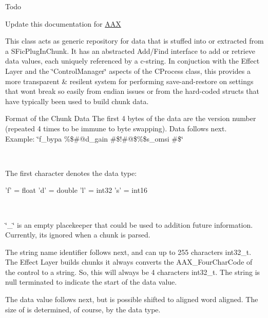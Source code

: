 \begin{DoxyRefDesc}{Todo}
\item[\hyperlink{a00382__todo000012}{Todo}]Update this documentation for \hyperlink{a00288}{A\+A\+X}\end{DoxyRefDesc}


This class acts as generic repository for data that is stuffed into or extracted from a S\+Fic\+Plug\+In\+Chunk. It has an abstracted Add/\+Find interface to add or retrieve data values, each uniquely referenced by a c-\/string. In conjuction with the Effect Layer and the \char`\"{}\+Control\+Manager\char`\"{} aspects of the C\+Process class, this provides a more transparent \& resilent system for performing save-\/and-\/restore on settings that won\textquotesingle{}t break so easily from endian issues or from the hard-\/coded structs that have typically been used to build chunk data.

\begin{DoxyParagraph}{Format of the Chunk Data}
The first 4 bytes of the data are the version number (repeated 4 times to be immune to byte swapping). Data follows next.~\newline
 ~\newline
Example\+: \char`\"{}f\+\_\+bypa \%\$\#@d\+\_\+gain \#\$!\#@\$\%\$s\+\_\+omsi \#\$\char`\"{} 
 ~\newline
\begin{DoxyItemize}
\item The first character denotes the data type\+: 
\begin{DoxyCode}
\textcolor{charliteral}{'f'} = \textcolor{keywordtype}{float}
\textcolor{charliteral}{'d'} = \textcolor{keywordtype}{double}
\textcolor{charliteral}{'l'} = int32
\textcolor{charliteral}{'s'} = int16
\end{DoxyCode}
 ~\newline
\item \char`\"{}\+\_\+\char`\"{} is an empty placekeeper that could be used to addition future information. Currently, it\textquotesingle{}s ignored when a chunk is parsed.\end{DoxyItemize}
\begin{DoxyItemize}
\item The string name identifier follows next, and can up to 255 characters int32\+\_\+t. The Effect Layer builds chunks it always converts the A\+A\+X\+\_\+\+Four\+Char\+Code of the control to a string. So, this will always be 4 characters int32\+\_\+t. The string is null terminated to indicate the start of the data value.\end{DoxyItemize}
\begin{DoxyItemize}
\item The data value follows next, but is possible shifted to aligned word aligned. The size of is determined, of course, by the data type. \end{DoxyItemize}

\end{DoxyParagraph}
